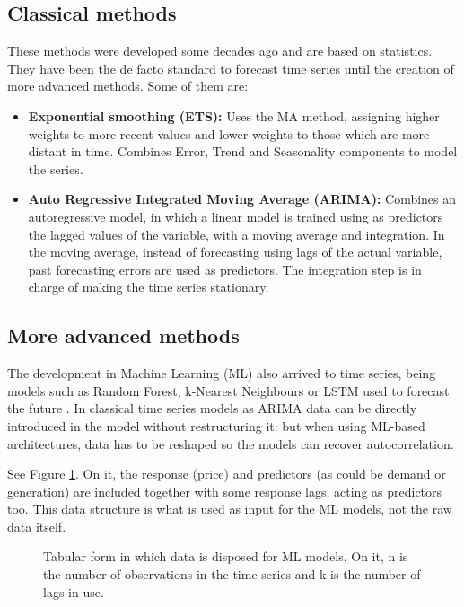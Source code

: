 \subsection{Classical methods}
These methods were developed some decades ago and are based on statistics. They have been the de facto standard to forecast time series until the creation of more advanced methods. Some of them are: \cite{lazzeri2020machine, hyndman2018forecasting}
\begin{itemize}
    \item \textbf{Exponential smoothing (ETS):} Uses the MA method, assigning higher weights to more recent values and lower weights to those which are more distant in time. Combines Error, Trend and Seasonality components to model the series.
    \item \textbf{Auto Regressive Integrated Moving Average (ARIMA):} Combines an autoregressive model, in which a linear model is trained using as predictors the lagged values of the variable, with a moving average and integration. In the moving average, instead of forecasting using lags of the actual variable, past forecasting errors are used as predictors. The integration step is in charge of making the time series stationary.
\end{itemize}

\subsection{More advanced methods}
The development in Machine Learning (ML) also arrived to time series, being models such as Random Forest, k-Nearest Neighbours or LSTM used to forecast the future \cite{lazzeri2020machine}.
In classical time series models as ARIMA data can be directly introduced in the model without restructuring it: but when using ML-based architectures, data has to be reshaped so the models can recover autocorrelation.

See Figure \ref{fig:ml-arrangement}.
On it, the response (price) and predictors (as could be demand or generation) are included together with some response lags, acting as predictors too.
This data structure is what is used as input for the ML models, not the raw data itself.

\begin{figure}[H]
\centering
    \caption{Tabular form in which data is disposed for ML models. On it, n is the number of observations in the time series and k is the number of lags in use.}
    \label{fig:ml-arrangement}
\end{figure}

